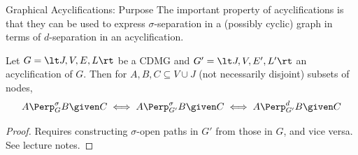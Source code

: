\begin{frame}{Graphical Acyclifications: Purpose}
The important property of acyclifications is that they can be used to express $\sigma$-separation in a (possibly cyclic) graph
in terms of $d$-separation in an acyclification.

\begin{Prp}[\ref{prp:sigma_sep_as_d_sep}]
  Let $G = \lt J, V, E, L \rt$ be a CDMG and $G' = \lt J, V, E', L' \rt$ an acyclification of $G$.
  Then for $A, B, C \subseteq V \cup J$ (not necessarily disjoint) subsets of nodes,
  $$A \Perp^\sigma_G B \given C \iff A \Perp^\sigma_{G'} B \given C \iff A \Perp^d_{G'} B \given C$$
\end{Prp}
\begin{proof}
  Requires constructing $\sigma$-open paths in $G'$ from those in $G$, and vice versa. 
  See lecture notes.
\end{proof}
\end{frame}

